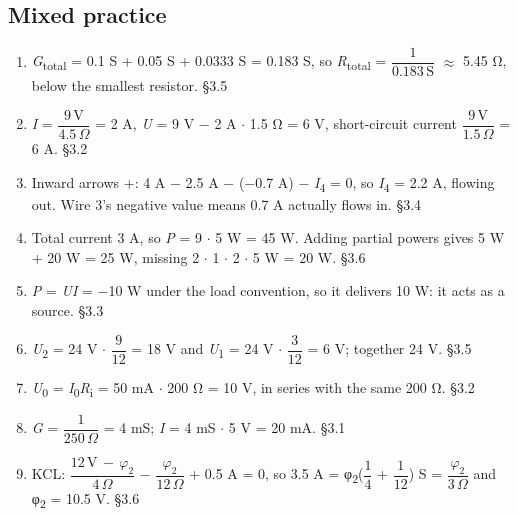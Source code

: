 \documentclass[11pt]{article}
\begin{document}
\begin{keepsection}\subsection{Mixed practice}

\begin{enumerate}
\item \textit{G}\textsubscript{total} = 0.1 S + 0.05 S + 0.0333 S = 0.183 S, so \textit{R}\textsubscript{total} = {\small\ensuremath{\dfrac{1}{0.183\, \mathrm{S}}}} \ensuremath{\approx} 5.45 Ω, below the smallest resistor. \hfill{\small\color{FAUblue}§3.5}
\item \textit{I} = {\small\ensuremath{\dfrac{9\, \mathrm{V}}{4.5\, Ω}}} = 2 A, \textit{U} = 9 V \ensuremath{-} 2 A \ensuremath{\cdot} 1.5 Ω = 6 V, short-circuit current {\small\ensuremath{\dfrac{9\, \mathrm{V}}{1.5\, Ω}}} = 6 A. \hfill{\small\color{FAUblue}§3.2}
\item Inward arrows +: 4 A \ensuremath{-} 2.5 A \ensuremath{-} (\ensuremath{-}0.7 A) \ensuremath{-} \textit{I}\textsubscript{4} = 0, so \textit{I}\textsubscript{4} = 2.2 A, flowing out. Wire 3’s negative value means 0.7 A actually flows in. \hfill{\small\color{FAUblue}§3.4}
\item Total current 3 A, so \textit{P} = 9 \ensuremath{\cdot} 5 W = 45 W. Adding partial powers gives 5 W + 20 W = 25 W, missing 2 \ensuremath{\cdot} 1 \ensuremath{\cdot} 2 \ensuremath{\cdot} 5 W = 20 W. \hfill{\small\color{FAUblue}§3.6}
\item \textit{P} = \textit{U}\textit{I} = \ensuremath{-}10 W under the load convention, so it delivers 10 W: it acts as a source. \hfill{\small\color{FAUblue}§3.3}
\item \textit{U}\textsubscript{2} = 24 V \ensuremath{\cdot} {\small\ensuremath{\dfrac{9}{12}}} = 18 V and \textit{U}\textsubscript{1} = 24 V \ensuremath{\cdot} {\small\ensuremath{\dfrac{3}{12}}} = 6 V; together 24 V. \hfill{\small\color{FAUblue}§3.5}
\item \textit{U}\textsubscript{0} = \textit{I}\textsubscript{0}\textit{R}\textsubscript{i} = 50 mA \ensuremath{\cdot} 200 Ω = 10 V, in series with the same 200 Ω. \hfill{\small\color{FAUblue}§3.2}
\item \textit{G} = {\small\ensuremath{\dfrac{1}{250\, Ω}}} = 4 mS; \textit{I} = 4 mS \ensuremath{\cdot} 5 V = 20 mA. \hfill{\small\color{FAUblue}§3.1}
\item KCL: {\small\ensuremath{\dfrac{12\, \mathrm{V}\, -\, φ_{2}}{4\, Ω}}} \ensuremath{-} {\small\ensuremath{\dfrac{φ_{2}}{12\, Ω}}} + 0.5 A = 0, so 3.5 A = φ\textsubscript{2}({\small\ensuremath{\dfrac{1}{4}}} + {\small\ensuremath{\dfrac{1}{12}}}) S = {\small\ensuremath{\dfrac{φ_{2}}{3\, Ω}}} and φ\textsubscript{2} = 10.5 V. \hfill{\small\color{FAUblue}§3.6}

\end{enumerate}
\end{keepsection}
\end{document}
